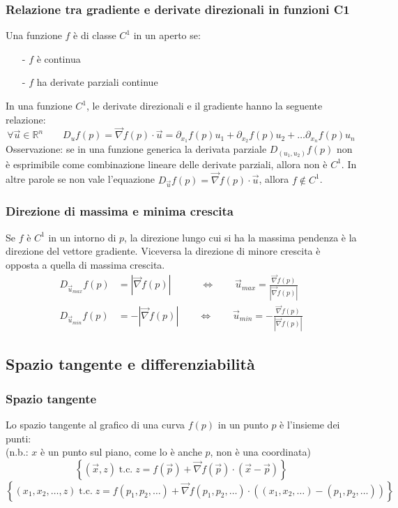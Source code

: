 \documentclass[a4paper]{article}
\newcommand\Rn{\mathbb{R}^n}  %
\newcommand\tc{\text{t.c.}}   %
\newcommand\nab{\vec{\nabla}} %
\begin{document}
\subsubsection*{Relazione tra gradiente e derivate direzionali in funzioni C1}
Una funzione \(f\) è di classe \(C^1\) in un aperto se:
\begin{itemize}[topsep=3pt, itemsep=0pt]
	\item[-] \(f\) è continua
	\item[-] \(f\) ha derivate parziali continue
\end{itemize}
In una funzione \(C^1\), le derivate direzionali e il gradiente hanno la seguente relazione:
\[\forall \vec{u} \in \Rn \qquad D_u f(p) = \nab f(p) \cdot \vec{u} = \partial_{x_1} f(p) u_1 + \partial_{x_2} f(p) u_2 + \dots \partial_{x_n} f(p) u_n\]
Osservazione: se in una funzione generica la derivata parziale \(D_{(u_1, u_2)} f(p)\) non è esprimibile come combinazione
lineare delle derivate parziali, allora non è \(C^1\). In altre parole se non vale l'equazione \(D_{\vec{u}} f(p) = \nab f(p) \cdot \vec{u}\), allora \(f \notin C^1\).

\subsubsection*{Direzione di massima e minima crescita}
Se \(f\) è \(C^1\) in un intorno di \(p\), la direzione lungo cui si ha la massima pendenza è la direzione del vettore gradiente.
Viceversa la direzione di minore crescita è opposta a quella di massima crescita.
\begin{align*}
	D_{\vec{u}_{max}} f(p) &= \left| \nab f(p)\right| \qquad \quad \Leftrightarrow \qquad \vec{u}_{max} = \frac{\nab f(p)}{\left| \nab f(p) \right|} \\
	D_{\vec{u}_{min}} f(p) &= -\left| \nab f(p)\right| \qquad \Leftrightarrow \qquad \vec{u}_{min} = -\frac{\nab f(p)}{\left| \nab f(p) \right|}
\end{align*}

\subsection{Spazio tangente e differenziabilità}
\subsubsection*{Spazio tangente}
Lo spazio tangente al grafico di una curva \(f(p)\) in un punto \(p\) è l'insieme dei punti: \\
(n.b.: \(x\) è un punto sul piano, come lo è anche \(p\), non è una coordinata)
\[\left\{ (\vec{x},z) \; \tc \; z = f(\vec{p}) + \nab f(\vec{p}) \cdot (\vec{x}-\vec{p})\right\}\]
\[\left\{ (x_1,x_2,\dots,z) \; \tc \; z = f(p_1,p_2, \dots) + \nab f(p_1,p_2, \dots) \cdot ((x_1,x_2, \dots) - (p_1,p_2, \dots))\right\}\]
\end{document}
